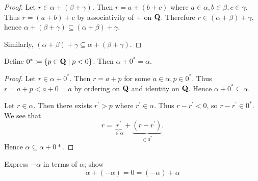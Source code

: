 \begin{proof}
Let $r\in\alpha+(\beta+\gamma)$. Then $r=a+(b+c)$ where $a\in\alpha,b\in\beta,c\in\gamma$. Thus $r=(a+b)+c$ by associativity of $+$ on $\mathbf Q$. Therefore $r\in(\alpha+\beta)+\gamma$, hence $\alpha+(\beta+\gamma)\subseteq(\alpha+\beta)+\gamma$.

Similarly, $(\alpha+\beta)+\gamma\subseteq\alpha+(\beta+\gamma)$.
\end{proof}

\begin{proposition}
Define $0^*\coloneqq\{p\in\mathbf Q\mid p<0\}$. Then $\alpha+0^*=\alpha$.
\end{proposition}

\begin{proof}
Let $r\in\alpha+0^*$. Then $r=a+p$ for some $a\in\alpha,p\in0^*$. Thus $r=a+p<a+0=a$ by ordering on $\mathbf Q$ and identity on $\mathbf Q$. Hence $\alpha+0^*\subseteq\alpha$.

Let $r\in\alpha$. Then there exists $r^\prime>p$ where $r^\prime\in\alpha$. Thus $r-r^\prime<0$, so $r-r^\prime\in0^*$. We see that
\[ r=\underbrace{r^\prime}_{\in\alpha}+\underbrace{(r-r^\prime)}_{\in0^*}. \]
Hence $\alpha\subseteq\alpha+0*$.
\end{proof}


\begin{exercise}
Express $-\alpha$ in terms of $\alpha$; show
\[ \alpha+(-\alpha)=0=(-\alpha)+\alpha \]
\end{exercise}

